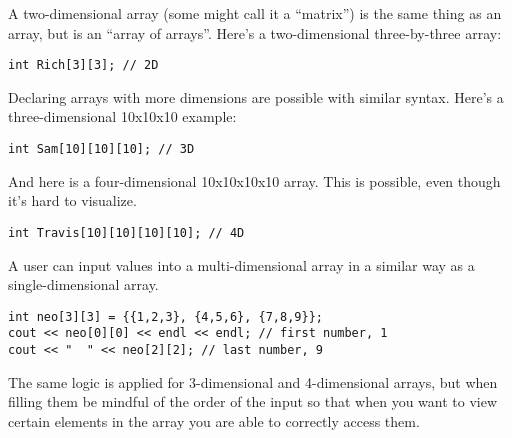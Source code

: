 
A two-dimensional array (some might call it a ``matrix'') is the same thing as an array, but is an ``array of arrays''.
Here's a two-dimensional three-by-three array:

\noindent\begin{minipage}{\linewidth}\begin{lstlisting}
int Rich[3][3]; // 2D
\end{lstlisting}\end{minipage}

Declaring arrays with more dimensions are possible with similar syntax. 
Here's a three-dimensional 10x10x10 example:

\noindent\begin{minipage}{\linewidth}\begin{lstlisting}
int Sam[10][10][10]; // 3D
\end{lstlisting}\end{minipage}

And here is a four-dimensional 10x10x10x10 array. 
This is possible, even though it's hard to visualize.

\noindent\begin{minipage}{\linewidth}\begin{lstlisting}
int Travis[10][10][10][10]; // 4D
\end{lstlisting}\end{minipage}

A user can input values into a multi-dimensional array in a similar way as a single-dimensional array. 

\noindent\begin{minipage}{\linewidth}\begin{lstlisting}
int neo[3][3] = {{1,2,3}, {4,5,6}, {7,8,9}}; 
cout << neo[0][0] << endl << endl; // first number, 1
cout << "  " << neo[2][2]; // last number, 9
\end{lstlisting}\end{minipage}


The same logic is applied for 3-dimensional and 4-dimensional arrays, but when filling them be mindful of the order of the input so that when you want to view certain elements in the array you are able to correctly access them. 


